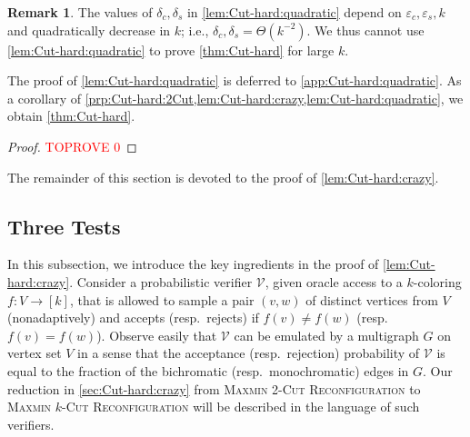 \documentclass[11pt,fleqn]{article}
\renewcommand{\epsilon}{\varepsilon}
\newcommand{\prb}[1]{\textsc{#1}\xspace}
\newcommand{\V}{\calV}
\newcommand{\f}{f}
\newcommand{\MMkCutReconf}{\prb{Maxmin $k$-Cut Reconfiguration}}
\newcommand{\MMtwoCutReconf}{\prb{Maxmin 2-Cut Reconfiguration}}
\newcommand{\calV}{\mathcal{V}}
\theoremstyle{definition}
\newtheorem{remark}[theorem]{Remark}
\numberwithin{equation}{section}
\begin{document}
\begin{remark}
    The values of $\delta_c,\delta_s$ in \cref{lem:Cut-hard:quadratic}
    depend on $\epsilon_c,\epsilon_s,k$ and quadratically decrease in $k$; i.e.,
    $\delta_c,\delta_s = \Theta(k^{-2})$.
    We thus cannot use \cref{lem:Cut-hard:quadratic} to prove \cref{thm:Cut-hard}
    for large $k$.
\end{remark}\noindent
The proof of \cref{lem:Cut-hard:quadratic} is deferred to \cref{app:Cut-hard:quadratic}.
As a corollary of \cref{prp:Cut-hard:2Cut,lem:Cut-hard:crazy,lem:Cut-hard:quadratic},
we obtain \cref{thm:Cut-hard}.


\begin{proof}\textcolor{red}{TOPROVE 0}\end{proof}


The remainder of this section is devoted to the proof of \cref{lem:Cut-hard:crazy}.


\subsection{Three Tests}
\label{sec:Cut-hard:tests}


In this subsection, we introduce the key ingredients in the proof of \cref{lem:Cut-hard:crazy}.
Consider a probabilistic verifier $\V$,
given oracle access to a $k$-coloring $\f \colon V \to [k]$,
that is allowed to
sample a pair $(v,w)$ of distinct vertices from $V$ (nonadaptively) and
accepts (resp.~rejects) if $\f(v) \neq \f(w)$ (resp.~$\f(v) = \f(w)$).
Observe easily that $\V$ can be emulated by a multigraph $G$ on vertex set $V$ in a sense that
the acceptance (resp.~rejection) probability of $\V$ is equal to
the fraction of the bichromatic (resp.~monochromatic) edges in $G$.
Our reduction in \cref{sec:Cut-hard:crazy} from \MMtwoCutReconf to \MMkCutReconf 
will be described in the language of such verifiers.
\end{document}
